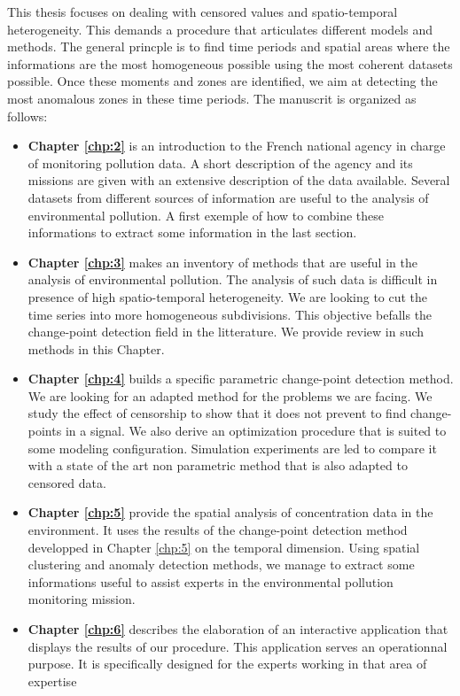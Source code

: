 This thesis focuses on dealing with censored values and spatio-temporal heterogeneity. This demands a procedure that articulates different models and methods. The general princple is to find time periods and spatial areas where the informations are the most homogeneous possible using the most coherent datasets possible. Once these moments and zones are identified, we aim at detecting the most anomalous zones in these time periods. The manuscrit is organized as follows: 
\begin{itemize}
\item{\textbf{Chapter \ref{chp:2}}} is an introduction to the French national agency in charge of monitoring pollution data. A short description of the agency and its missions are given with an extensive description of the data available. Several datasets from different sources of information are useful to the analysis of environmental pollution. A first exemple of how to combine these informations to extract some information in the last section.        
\item{\textbf{Chapter \ref{chp:3}}} makes an inventory of methods that are useful in the analysis of environmental pollution. The analysis of such data is difficult in presence of high spatio-temporal heterogeneity. We are looking to cut the time series into more homogeneous subdivisions. This objective befalls the change-point detection field in the litterature. We provide review in such methods in this Chapter.    
\item{\textbf{Chapter \ref{chp:4}}} builds a specific parametric change-point detection method. We are looking for an adapted method for the problems we are facing. We study the effect of censorship to show that it does not prevent to find change-points in a signal. We also derive an optimization procedure that is suited to some modeling configuration. Simulation experiments are led to compare it with a state of the art non parametric method that is also adapted to censored data.        
\item{\textbf{Chapter \ref{chp:5}}} provide the spatial analysis of concentration data in the environment. It uses the results of the change-point detection method developped in Chapter \ref{chp:5} on the temporal dimension. Using spatial clustering and anomaly detection methods, we manage to extract some informations useful to assist experts in the environmental pollution monitoring mission.     
\item{\textbf{Chapter \ref{chp:6}}} describes the elaboration of an interactive application that displays the results of our procedure. This application serves an operationnal purpose. It is specifically designed for the experts working in that area of expertise  
\end{itemize}
